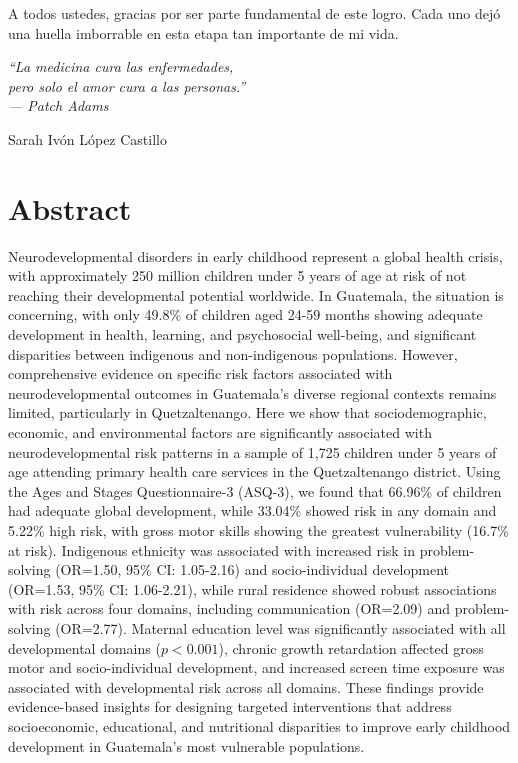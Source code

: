 \documentclass[11pt,letterpaper]{report}
\begin{document}
A todos ustedes, gracias por ser parte fundamental de este logro. Cada uno
dejó una huella imborrable en esta etapa tan importante de mi vida.

\vspace{0.5cm}

\begin{center}
\textit{``La medicina cura las enfermedades, \\
pero solo el amor cura a las personas.''} \\
\textit{--- Patch Adams}
\end{center}


\begin{flushright}
Sarah Ivón López Castillo
\end{flushright}

\chapter*{Abstract}
Neurodevelopmental disorders in early childhood represent a global health 
crisis, with approximately 250 million children under 5 years of age at risk 
of not reaching their developmental potential worldwide. In Guatemala, the 
situation is concerning, with only 49.8\% of children aged 24-59 months 
showing adequate development in health, learning, and psychosocial well-being, 
and significant disparities between indigenous and non-indigenous populations. 
However, comprehensive evidence on specific risk factors associated with 
neurodevelopmental outcomes in Guatemala's diverse regional contexts remains 
limited, particularly in Quetzaltenango. Here we show that sociodemographic, 
economic, and environmental factors are significantly associated with 
neurodevelopmental risk patterns in a sample of 1,725 children under 5 years 
of age attending primary health care services in the Quetzaltenango district. 
Using the Ages and Stages Questionnaire-3 (ASQ-3), we found that 66.96\% of 
children had adequate global development, while 33.04\% showed risk in any 
domain and 5.22\% high risk, with gross motor skills showing the greatest 
vulnerability (16.7\% at risk). Indigenous ethnicity was associated with 
increased risk in problem-solving (OR=1.50, 95\% CI: 1.05-2.16) and 
socio-individual development (OR=1.53, 95\% CI: 1.06-2.21), while rural 
residence showed robust associations with risk across four domains, including 
communication (OR=2.09) and problem-solving (OR=2.77). Maternal education 
level was significantly associated with all developmental domains ($p<0.001$), 
chronic growth retardation affected gross motor and socio-individual 
development, and increased screen time exposure was associated with 
developmental risk across all domains. These findings provide evidence-based 
insights for designing targeted interventions that address socioeconomic, 
educational, and nutritional disparities to improve early childhood 
development in Guatemala's most vulnerable populations.
\end{document}
